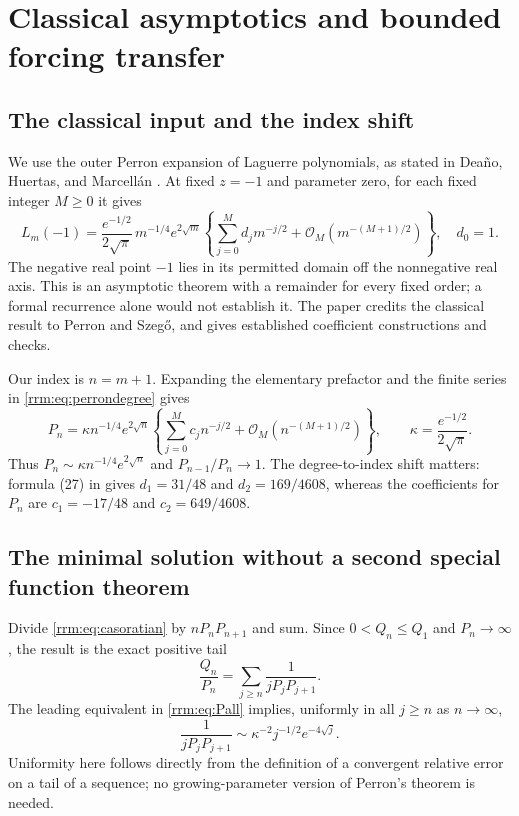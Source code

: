 \documentclass[11pt]{article}
\theoremstyle{remark}\newtheorem{remark}[theorem]{Remark}
\newcommand{\OO}{\mathcal O}
\begin{document}
\section{Classical asymptotics and bounded forcing transfer}\label{rrm:sec:perron}
\subsection{The classical input and the index shift}
We use the outer Perron expansion of Laguerre polynomials, as stated in Dea\~no, Huertas, and Marcell\'an \cite[formula (3)]{dhm}. At fixed $z=-1$ and parameter zero, for each fixed integer $M\ge0$ it gives
\begin{equation}\label{rrm:eq:perrondegree}
 L_m(-1)=\frac{e^{-1/2}}{2\sqrt\pi}\,m^{-1/4}e^{2\sqrt m}
 \left\{\sum_{j=0}^M d_jm^{-j/2}
       +\OO_M(m^{-(M+1)/2})\right\},\quad d_0=1.
\end{equation}
The negative real point $-1$ lies in its permitted domain off the nonnegative real axis. This is an asymptotic theorem with a remainder for every fixed order; a formal recurrence alone would not establish it. The paper credits the classical result to Perron and Szeg\H{o}, and gives established coefficient constructions and checks.

Our index is $n=m+1$. Expanding the elementary prefactor and the finite series in \eqref{rrm:eq:perrondegree} gives
\begin{equation}\label{rrm:eq:Pall}
 P_n=\kappa n^{-1/4}e^{2\sqrt n}
 \left\{\sum_{j=0}^M c_jn^{-j/2}
       +\OO_M(n^{-(M+1)/2})\right\},\qquad
 \kappa=\frac{e^{-1/2}}{2\sqrt\pi}.
\end{equation}
Thus $P_n\sim\kappa n^{-1/4}e^{2\sqrt n}$ and $P_{n-1}/P_n\to1$. The degree-to-index shift matters: formula (27) in \cite{dhm} gives $d_1=31/48$ and $d_2=169/4608$, whereas the coefficients for $P_n$ are $c_1=-17/48$ and $c_2=649/4608$.

\subsection{The minimal solution without a second special function theorem}
Divide \eqref{rrm:eq:casoratian} by $nP_nP_{n+1}$ and sum. Since $0<Q_n\le Q_1$ and $P_n\to\infty$, the result is the exact positive tail
\begin{equation}\label{rrm:eq:reductionorder}
 \frac{Q_n}{P_n}=\sum_{j\ge n}\frac1{jP_jP_{j+1}}.
\end{equation}
The leading equivalent in \eqref{rrm:eq:Pall} implies, uniformly in all $j\ge n$ as $n\to\infty$,
\[
 \frac1{jP_jP_{j+1}}
 \sim\kappa^{-2}j^{-1/2}e^{-4\sqrt j}.
\]
Uniformity here follows directly from the definition of a convergent relative error on a tail of a sequence; no growing-parameter version of Perron's theorem is needed.
\end{document}
